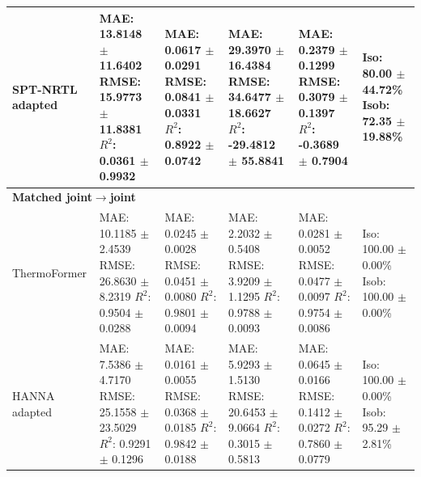 \begin{tabular}{llllll}
SPT-NRTL adapted & \shortstack[l]{MAE: 13.8148 $\pm$ 11.6402 \\ RMSE: 15.9773 $\pm$ 11.8381 \\ $R^2$: 0.0361 $\pm$ 0.9932} & \shortstack[l]{MAE: 0.0617 $\pm$ 0.0291 \\ RMSE: 0.0841 $\pm$ 0.0331 \\ $R^2$: 0.8922 $\pm$ 0.0742} & \shortstack[l]{MAE: 29.3970 $\pm$ 16.4384 \\ RMSE: 34.6477 $\pm$ 18.6627 \\ $R^2$: -29.4812 $\pm$ 55.8841} & \shortstack[l]{MAE: 0.2379 $\pm$ 0.1299 \\ RMSE: 0.3079 $\pm$ 0.1397 \\ $R^2$: -0.3689 $\pm$ 0.7904} & \shortstack[l]{Iso: 80.00 $\pm$ 44.72\% \\ Isob: 72.35 $\pm$ 19.88\%} \\
\hline
\multicolumn{6}{l}{\textbf{Matched joint$\to$joint}} \\
ThermoFormer & \shortstack[l]{MAE: 10.1185 $\pm$ 2.4539 \\ RMSE: 26.8630 $\pm$ 8.2319 \\ $R^2$: 0.9504 $\pm$ 0.0288} & \shortstack[l]{MAE: 0.0245 $\pm$ 0.0028 \\ RMSE: 0.0451 $\pm$ 0.0080 \\ $R^2$: 0.9801 $\pm$ 0.0094} & \shortstack[l]{MAE: 2.2032 $\pm$ 0.5408 \\ RMSE: 3.9209 $\pm$ 1.1295 \\ $R^2$: 0.9788 $\pm$ 0.0093} & \shortstack[l]{MAE: 0.0281 $\pm$ 0.0052 \\ RMSE: 0.0477 $\pm$ 0.0097 \\ $R^2$: 0.9754 $\pm$ 0.0086} & \shortstack[l]{Iso: 100.00 $\pm$ 0.00\% \\ Isob: 100.00 $\pm$ 0.00\%} \\
HANNA adapted & \shortstack[l]{MAE: 7.5386 $\pm$ 4.7170 \\ RMSE: 25.1558 $\pm$ 23.5029 \\ $R^2$: 0.9291 $\pm$ 0.1296} & \shortstack[l]{MAE: 0.0161 $\pm$ 0.0055 \\ RMSE: 0.0368 $\pm$ 0.0185 \\ $R^2$: 0.9842 $\pm$ 0.0188} & \shortstack[l]{MAE: 5.9293 $\pm$ 1.5130 \\ RMSE: 20.6453 $\pm$ 9.0664 \\ $R^2$: 0.3015 $\pm$ 0.5813} & \shortstack[l]{MAE: 0.0645 $\pm$ 0.0166 \\ RMSE: 0.1412 $\pm$ 0.0272 \\ $R^2$: 0.7860 $\pm$ 0.0779} & \shortstack[l]{Iso: 100.00 $\pm$ 0.00\% \\ Isob: 95.29 $\pm$ 2.81\%} \\

\end{tabular}
